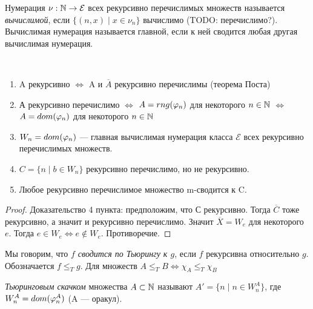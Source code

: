 \begin{definition}
    Нумерация $\nu: {\mathbb N}\rightarrow \mathcal{E}$ всех рекурсивно перечислимых множеств называется \emph{вычислимой}, если $\{(n, x)\mid x\in\nu_n \}$ вычислимо (TODO: перечислимо?). Вычислимая нумерация называется главной, если к ней сводится любая другая вычислимая нумерация.
\end{definition}
\begin{prop}\
    \begin{enumerate}
        \item A рекурсивно $\Leftrightarrow$ A и $\overline{A}$ рекурсивно перечислимы (теорема Поста)
        \item А рекурсивно перечислимо $\Leftrightarrow$ $A=rng(\varphi_n)$ для некоторого $n\in {\mathbb N}$ $\Leftrightarrow$ $A = dom(\varphi_n)$ для некоторого $n\in{\mathbb N}$
        \item $W_n = dom(\varphi_n)$ — главная вычислимая нумерация класса $\mathcal{E}$ всех рекурсивно перечислимых множеств.
        \item $C = \{n \mid b\in W_n\}$ рекурсивно перечислимо, но не рекурсивно.
        \item Любое рекурсивно перечислимое множество m-сводится к C.
    \end{enumerate}
\end{prop}

\begin{proof}

    Доказательство 4 пункта: предположим, что С рекурсивно. Тогда $\overline{C}$ тоже рекурсивно, а значит и рекурсивно перечислимо. Значит $\overline{X} = W_e$ для некоторого $e$. Тогда $e\in W_e \Leftrightarrow  e\notin W_e$. Противоречие.

\end{proof}

\begin{definition}
    Мы говорим, что \emph{$f$ сводится по Тьюрингу к $g$}, если $f$ рекурсивна относительно $g$. Обозначается $f\le_T g$. Для множеств $A\le_T B \Leftrightarrow \chi_A \le_T \chi_B$ 
\end{definition}

\begin{definition}
    \emph{Тьюринговым скачком} множества $A\subset {\mathbb N}$ называют $A'=\{n\mid n\in W_n^A\}$, где $W_n^A = dom(\varphi_n^A)$ (A — оракул).
\end{definition}

